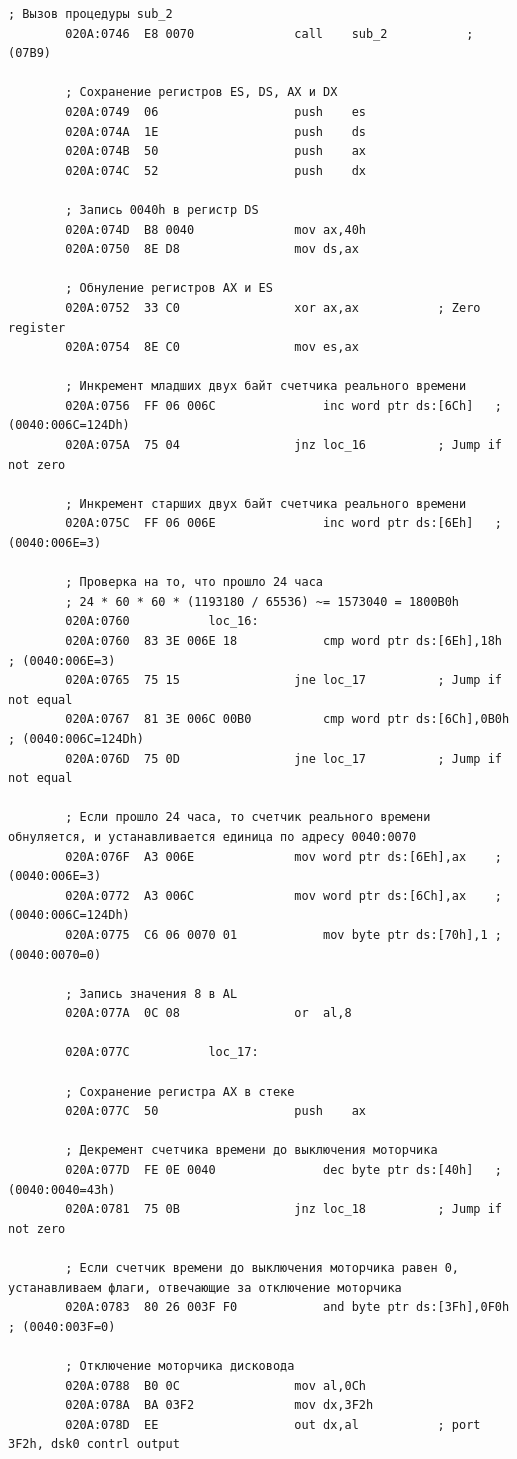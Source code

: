 \documentclass[14pt, a4paper]{article}
\begin{document}
	\begin{lstlisting}[style={asm}]
		; Вызов процедуры sub_2
		020A:0746  E8 0070				call	sub_2			; (07B9)
		
		; Сохранение регистров ES, DS, AX и DX
		020A:0749  06					push	es
		020A:074A  1E					push	ds
		020A:074B  50					push	ax
		020A:074C  52					push	dx
		
		; Запись 0040h в регистр DS
		020A:074D  B8 0040				mov	ax,40h
		020A:0750  8E D8				mov	ds,ax
		
		; Обнуление регистров AX и ES
		020A:0752  33 C0				xor	ax,ax			; Zero register
		020A:0754  8E C0				mov	es,ax
		
		; Инкремент младших двух байт счетчика реального времени
		020A:0756  FF 06 006C				inc	word ptr ds:[6Ch]	; (0040:006C=124Dh)
		020A:075A  75 04				jnz	loc_16			; Jump if not zero
		
		; Инкремент старших двух байт счетчика реального времени
		020A:075C  FF 06 006E				inc	word ptr ds:[6Eh]	; (0040:006E=3)
		
		; Проверка на то, что прошло 24 часа
		; 24 * 60 * 60 * (1193180 / 65536) ~= 1573040 = 1800B0h
		020A:0760			loc_16:
		020A:0760  83 3E 006E 18			cmp	word ptr ds:[6Eh],18h	; (0040:006E=3)
		020A:0765  75 15				jne	loc_17			; Jump if not equal
		020A:0767  81 3E 006C 00B0			cmp	word ptr ds:[6Ch],0B0h	; (0040:006C=124Dh)
		020A:076D  75 0D				jne	loc_17			; Jump if not equal
		
		; Если прошло 24 часа, то счетчик реального времени обнуляется, и устанавливается единица по адресу 0040:0070
		020A:076F  A3 006E				mov	word ptr ds:[6Eh],ax	; (0040:006E=3)
		020A:0772  A3 006C				mov	word ptr ds:[6Ch],ax	; (0040:006C=124Dh)
		020A:0775  C6 06 0070 01			mov	byte ptr ds:[70h],1	; (0040:0070=0)
		
		; Запись значения 8 в AL
		020A:077A  0C 08				or	al,8
		
		020A:077C			loc_17:
		
		; Сохранение регистра AX в стеке
		020A:077C  50					push	ax
		
		; Декремент счетчика времени до выключения моторчика
		020A:077D  FE 0E 0040				dec	byte ptr ds:[40h]	; (0040:0040=43h)
		020A:0781  75 0B				jnz	loc_18			; Jump if not zero
		
		; Если счетчик времени до выключения моторчика равен 0, устанавливаем флаги, отвечающие за отключение моторчика
		020A:0783  80 26 003F F0			and	byte ptr ds:[3Fh],0F0h	; (0040:003F=0)
		
		; Отключение моторчика дисковода
		020A:0788  B0 0C				mov	al,0Ch
		020A:078A  BA 03F2				mov	dx,3F2h
		020A:078D  EE					out	dx,al			; port 3F2h, dsk0 contrl output
		

\end{lstlisting}
\end{document}
